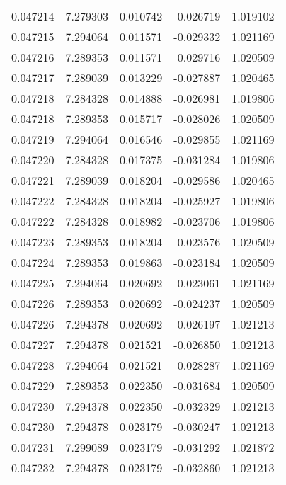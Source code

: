 \begin{tabular}{lrrrr}
0.047214    &  7.279303 &  0.010742 & -0.026719 &             1.019102 \\
0.047215    &  7.294064 &  0.011571 & -0.029332 &             1.021169 \\
0.047216    &  7.289353 &  0.011571 & -0.029716 &             1.020509 \\
0.047217    &  7.289039 &  0.013229 & -0.027887 &             1.020465 \\
0.047218    &  7.284328 &  0.014888 & -0.026981 &             1.019806 \\
0.047218    &  7.289353 &  0.015717 & -0.028026 &             1.020509 \\
0.047219    &  7.294064 &  0.016546 & -0.029855 &             1.021169 \\
0.047220    &  7.284328 &  0.017375 & -0.031284 &             1.019806 \\
0.047221    &  7.289039 &  0.018204 & -0.029586 &             1.020465 \\
0.047222    &  7.284328 &  0.018204 & -0.025927 &             1.019806 \\
0.047222    &  7.284328 &  0.018982 & -0.023706 &             1.019806 \\
0.047223    &  7.289353 &  0.018204 & -0.023576 &             1.020509 \\
0.047224    &  7.289353 &  0.019863 & -0.023184 &             1.020509 \\
0.047225    &  7.294064 &  0.020692 & -0.023061 &             1.021169 \\
0.047226    &  7.289353 &  0.020692 & -0.024237 &             1.020509 \\
0.047226    &  7.294378 &  0.020692 & -0.026197 &             1.021213 \\
0.047227    &  7.294378 &  0.021521 & -0.026850 &             1.021213 \\
0.047228    &  7.294064 &  0.021521 & -0.028287 &             1.021169 \\
0.047229    &  7.289353 &  0.022350 & -0.031684 &             1.020509 \\
0.047230    &  7.294378 &  0.022350 & -0.032329 &             1.021213 \\
0.047230    &  7.294378 &  0.023179 & -0.030247 &             1.021213 \\
0.047231    &  7.299089 &  0.023179 & -0.031292 &             1.021872 \\
0.047232    &  7.294378 &  0.023179 & -0.032860 &             1.021213 \\

\end{tabular}
